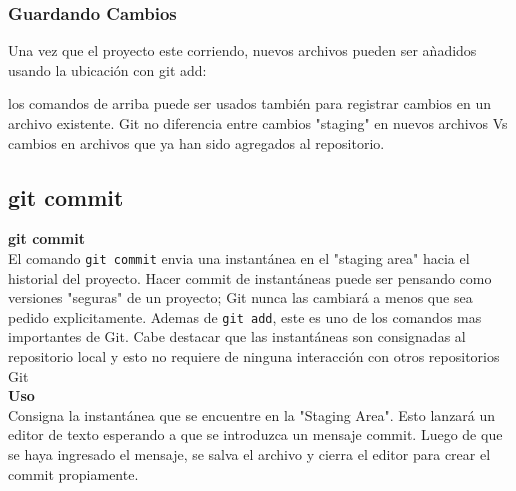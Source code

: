 \documentclass[8pt]{beamer}
\begin{document}
\begin{frame}
\frametitle{Guardando Cambios}
Una vez que el proyecto este corriendo, nuevos archivos pueden ser a\`nadidos usando la ubicaci\'on con \textrm{git add}:

los comandos de arriba puede ser usados tambi\'en para registrar cambios en un archivo existente. Git no diferencia entre cambios "staging" en nuevos archivos Vs cambios en archivos que ya han sido agregados al repositorio.\\
\medskip
\subsection{git commit}
\textbf{git commit}\\
\medskip
El comando \texttt{git commit} envia una instant\'anea en el "staging area" hacia el historial del proyecto. Hacer commit de instant\'aneas puede ser pensando como versiones "seguras" de un proyecto; Git nunca las cambiar\'a a menos que sea pedido explicitamente. Ademas de \texttt{git add}, este es uno de los comandos mas importantes de Git. Cabe destacar que las instant\'aneas son consignadas al repositorio local y esto no requiere de ninguna interacci\'on con otros repositorios Git\\
\medskip
\textbf{Uso}\\

Consigna la instant\'anea que se encuentre en la "Staging Area". Esto lanzar\'a un editor de texto esperando a que se introduzca un mensaje commit. Luego de que se haya ingresado el mensaje, se salva el archivo y cierra el editor para crear el commit propiamente.
\end{frame}
\end{document}
